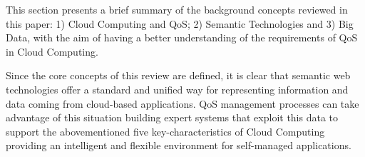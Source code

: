 This section presents a brief summary of the background concepts reviewed in this paper: 1) Cloud Computing and QoS; 2) Semantic Technologies 
and 3) Big Data, with the aim of having a better understanding of the requirements of QoS in Cloud Computing.


Since the core concepts of this review are defined, it is clear that semantic web technologies offer a standard and unified way for representing information and data coming from cloud-based applications. 
QoS management processes can take advantage of this situation building expert systems that exploit this data to support the abovementioned five key-characteristics of 
Cloud Computing providing an intelligent and flexible environment for self-managed applications.
